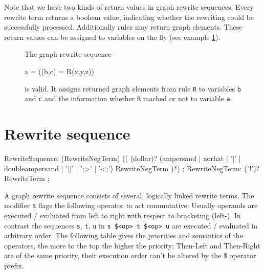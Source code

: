 Note that we have two kinds of return values in graph rewrite sequences.
Every rewrite term returns a boolean value, indicating whether the rewriting could be successfully processed.
Additionally rules may return graph elements.
These return values can be assigned to variables on the fly (see example \ref{ex:grsreturn}).
\begin{figure}[htbp]
\begin{example}
	\label{ex:grsreturn}
	The graph rewrite sequence
	\begin{grgen}	 
a = ((b,c) = R(x,y,z))
	\end{grgen}
	is valid. 
	It assigns returned graph elements from rule \texttt{R} to variables \texttt{b} and \texttt{c} and the information whether \texttt{R} mached or not to variable \texttt{a}.
\end{example}
\end{figure}

\section{Rewrite sequence}

\makeatletter

\begin{rail}
  RewriteSequence: 
    (RewriteNegTerm) (( (dollar)? (ampersand | xorhat | '|' | doubleampersand | '||' | ';>' | '<;') RewriteNegTerm )*)
	;
  RewriteNegTerm: 
    ('!')? RewriteTerm
	;
\end{rail}

A graph rewrite sequence consists of several, logically linked rewrite terms.
The modifier \texttt{\$} flags the following operator to act commutative: Usually operands are executed / evaluated from left to right with respect to bracketing (left-). 
In contrast the sequences \texttt{s}, \texttt{t}, \texttt{u} in \texttt{s \$<op> t \$<op> u} are executed / evaluated in arbitrary order.
The following table gives the priorities and semantics of the operators, the more to the top the higher the priority;
Then-Left and Then-Right are of the same priority, their execution order can't be altered by the \$ operator prefix.

